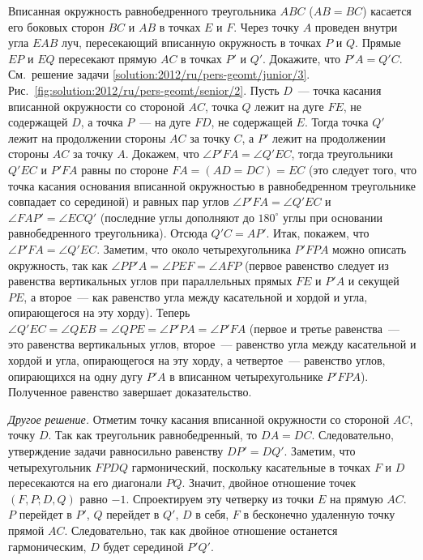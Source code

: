 \problem
Вписанная окружность равнобедренного треугольника $ABC$ ($AB = BC$) касается
его боковых сторон $BC$ и $AB$ в точках $E$ и $F$.
Через точку $A$ проведен внутри угла $EAB$ луч, пересекающий вписанную
окружность в точках $P$ и $Q$.
Прямые $EP$ и $EQ$ пересекают прямую $AC$ в точках $P'$ и $Q'$.
Докажите, что $P'A = Q'C$.
\solution
\label{solution:2012/ru/pers-geomt/senior/2}%
\ifsolutiondefined
См.~решение задачи \ref{solution:2012/ru/pers-geomt/junior/3}.
\else
{}
Рис.~\ref{fig:solution:2012/ru/pers-geomt/senior/2}.
Пусть $D$~--- точка касания вписанной окружности со стороной $AC$,
точка $Q$ лежит на дуге $FE$, не содержащей $D$,
а точка $P$~--- на дуге $FD$, не содержащей $E$.
Тогда точка $Q'$ лежит на продолжении стороны $AC$ за точку $C$,
а $P'$ лежит на продолжении стороны $AC$ за точку $A$.
Докажем, что $\angle P'FA = \angle Q'EC$, тогда треугольники $Q'EC$ и $P'FA$
равны по стороне $FA = (AD = DC) = EC$
(это следует того, что точка касания основания вписанной окружностью
в равнобедренном треугольнике совпадает со серединой)
и равных пар углов $\angle P'FA = \angle Q'EC$ и $\angle FAP' = \angle ECQ'$
(последние углы дополняют до $180^\circ$ углы при основании равнобедренного
треугольника).
Отсюда $Q'C = AP'$.
Итак, покажем, что $\angle P'FA = \angle Q'EC$.
Заметим, что около четырехугольника $P'FPA$ можно описать окружность, так как
$\angle PP'A = \angle PEF = \angle AFP$
(первое равенство следует из равенства вертикальных углов при параллельных
прямых $FE$ и $P'A$ и секущей $PE$, а второе~--- как равенство угла между
касательной и хордой и угла, опирающегося на эту хорду).
Теперь
\(
    \angle Q' E C = \angle QEB = \angle QPE = \angle P' P A = \angle P' F A
\)
(первое и третье равенства~--- это равенства вертикальных углов,
второе~--- равенство угла между касательной и хордой и угла, опирающегося на
эту хорду, а четвертое~--- равенство углов, опирающихся на одну дугу $P'A$
в вписанном четырехугольнике $P'FPA$).
Полученное равенство завершает доказательство.
\par
\emph{Другое решение.}
Отметим точку касания вписанной окружности со стороной $AC$, точку $D$.
Так как треугольник равнобедренный, то $DA = DC$.
Следовательно, утверждение задачи равносильно равенству $DP' = DQ'$.
Заметим, что четырехугольник $FPDQ$ гармонический, поскольку касательные в
точках $F$ и $D$ пересекаются на его диагонали $PQ$.
Значит, двойное отношение точек $(F, P; D, Q)$ равно $-1$.
Спроектируем эту четверку из точки $E$ на прямую $AC$.
$P$ перейдет в $P'$, $Q$ перейдет в $Q'$, $D$ в себя, $F$ в бесконечно
удаленную точку прямой $AC$.
Следовательно, так как двойное отношение останется гармоническим, $D$ будет
серединой $P'Q'$.
\fi %
\endproblem
